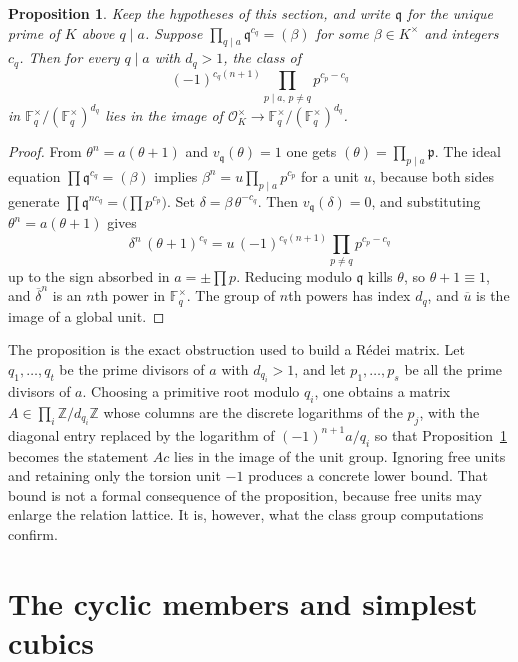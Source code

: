 \documentclass[11pt]{article}
\newtheorem{proposition}[theorem]{Proposition}
\theoremstyle{definition}
\theoremstyle{remark}
\newcommand{\Z}{\mathbb{Z}}
\newcommand{\F}{\mathbb{F}}
\newcommand{\OK}{\mathcal{O}_K}
\begin{document}
\begin{proposition}\label{prop:local}
Keep the hypotheses of this section, and write $\mathfrak{q}$ for the unique
prime of $K$ above $q\mid a$. Suppose $\prod_{q\mid a}\mathfrak{q}^{c_q}=(\beta)$
for some $\beta\in K^{\times}$ and integers $c_q$. Then for every $q\mid a$ with
$d_q>1$, the class of
\[
(-1)^{c_q(n+1)}\prod_{p\mid a,\,p\neq q}p^{c_p-c_q}
\]
in $\F_q^{\times}/(\F_q^{\times})^{d_q}$ lies in the image of
$\OK^{\times}\to\F_q^{\times}/(\F_q^{\times})^{d_q}$.
\end{proposition}

\begin{proof}
From $\theta^{n}=a(\theta+1)$ and $v_{\mathfrak{q}}(\theta)=1$ one gets
$(\theta)=\prod_{p\mid a}\mathfrak{p}$. The ideal equation
$\prod\mathfrak{q}^{c_q}=(\beta)$ implies $\beta^{n}=u\prod_{p\mid a}p^{c_p}$ for
a unit $u$, because both sides generate
$\prod\mathfrak{q}^{nc_q}=\bigl(\prod p^{c_p}\bigr)$. Set
$\delta=\beta\,\theta^{-c_q}$. Then $v_{\mathfrak{q}}(\delta)=0$, and substituting
$\theta^{n}=a(\theta+1)$ gives
\[
\delta^{n}\,(\theta+1)^{c_q}
=u\,(-1)^{c_q(n+1)}\prod_{p\neq q}p^{c_p-c_q}
\]
up to the sign absorbed in $a=\pm\prod p$. Reducing modulo $\mathfrak{q}$ kills
$\theta$, so $\theta+1\equiv 1$, and $\overline{\delta}^{n}$ is an $n$th power in
$\F_q^{\times}$. The group of $n$th powers has index $d_q$, and $\overline{u}$ is
the image of a global unit.
\end{proof}

The proposition is the exact obstruction used to build a R\'edei matrix. Let
$q_1,\ldots,q_t$ be the prime divisors of $a$ with $d_{q_i}>1$, and let
$p_1,\ldots,p_s$ be all the prime divisors of $a$. Choosing a primitive root
modulo $q_i$, one obtains a matrix $A\in\prod_i\Z/d_{q_i}\Z$ whose columns are
the discrete logarithms of the $p_j$, with the diagonal entry replaced by the
logarithm of $(-1)^{n+1}a/q_i$ so that Proposition~\ref{prop:local} becomes the
statement $Ac$ lies in the image of the unit group. Ignoring free units and
retaining only the torsion unit $-1$ produces a concrete lower bound. That bound
is not a formal consequence of the proposition, because free units may enlarge
the relation lattice. It is, however, what the class group computations confirm.

\section{The cyclic members and simplest cubics}\label{sec:simple}
\end{document}
